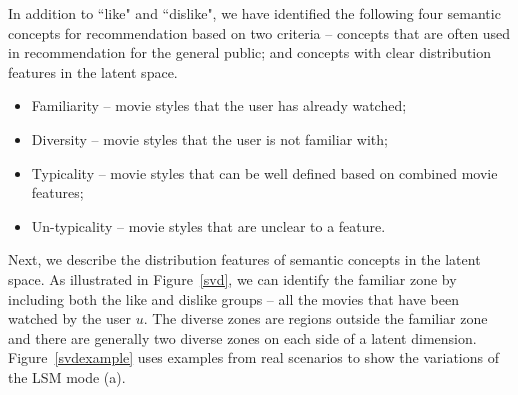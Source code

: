 \documentclass{vgtc}                          %
\begin{document}
In addition to ``like" and ``dislike", we have identified the following four semantic concepts for recommendation based on two criteria -- concepts that are often used in recommendation for the general public; 
and concepts with clear distribution features in the latent space.

\begin{itemize}
\item Familiarity -- movie styles that the user has already watched;
\vspace{-2mm}
\item Diversity -- movie styles that the user is not familiar with;
\vspace{-2mm}
\item Typicality -- movie styles that can be well defined based on combined movie features;
\vspace{-2mm}
\item Un-typicality -- movie styles that are unclear to a feature.
\end{itemize}

Next, we describe the distribution features of semantic concepts in the latent space.
As illustrated in Figure~\ref{svd}, we can identify the familiar zone by including both the like and dislike groups -- all the movies that have been watched by the user $u$.
The diverse zones are regions outside the familiar zone and there are generally two diverse zones on each side of a latent dimension.
Figure~\ref{svdexample} uses examples from real scenarios to show the variations of the LSM mode (a).
\end{document}
